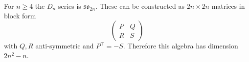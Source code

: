 For $n\ge 4$ the $D_n$ series
is $\mathfrak{so}_{2n}$.
These can be constructed as $2n\times2n$ matrices
in block form 
$$
\left(\begin{array}{ll}
P & Q \\
R & S
\end{array}\right)
$$
with $Q,R$ anti-symmetric and $P^{\top}=-S.$
Therefore this algebra has dimension $2n^2 - n.$

%
%
%


